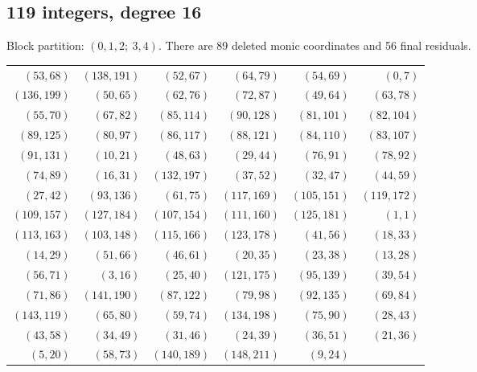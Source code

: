 \documentclass[10pt,letterpaper]{article}
\theoremstyle{remark}\newtheorem{remark}[theorem]{Remark}
\begin{document}
\subsection{119 integers, degree 16}
Block partition: $(0,1,2;\ 3,4)$.
There are 89 deleted monic coordinates and 56 final residuals.
\begin{center}\small\begin{tabular}{rrrrrr}\toprule
$(53,68)$ & $(138,191)$ & $(52,67)$ & $(64,79)$ & $(54,69)$ & $(0,7)$\\
$(136,199)$ & $(50,65)$ & $(62,76)$ & $(72,87)$ & $(49,64)$ & $(63,78)$\\
$(55,70)$ & $(67,82)$ & $(85,114)$ & $(90,128)$ & $(81,101)$ & $(82,104)$\\
$(89,125)$ & $(80,97)$ & $(86,117)$ & $(88,121)$ & $(84,110)$ & $(83,107)$\\
$(91,131)$ & $(10,21)$ & $(48,63)$ & $(29,44)$ & $(76,91)$ & $(78,92)$\\
$(74,89)$ & $(16,31)$ & $(132,197)$ & $(37,52)$ & $(32,47)$ & $(44,59)$\\
$(27,42)$ & $(93,136)$ & $(61,75)$ & $(117,169)$ & $(105,151)$ & $(119,172)$\\
$(109,157)$ & $(127,184)$ & $(107,154)$ & $(111,160)$ & $(125,181)$ & $(1,1)$\\
$(113,163)$ & $(103,148)$ & $(115,166)$ & $(123,178)$ & $(41,56)$ & $(18,33)$\\
$(14,29)$ & $(51,66)$ & $(46,61)$ & $(20,35)$ & $(23,38)$ & $(13,28)$\\
$(56,71)$ & $(3,16)$ & $(25,40)$ & $(121,175)$ & $(95,139)$ & $(39,54)$\\
$(71,86)$ & $(141,190)$ & $(87,122)$ & $(79,98)$ & $(92,135)$ & $(69,84)$\\
$(143,119)$ & $(65,80)$ & $(59,74)$ & $(134,198)$ & $(75,90)$ & $(28,43)$\\
$(43,58)$ & $(34,49)$ & $(31,46)$ & $(24,39)$ & $(36,51)$ & $(21,36)$\\
$(5,20)$ & $(58,73)$ & $(140,189)$ & $(148,211)$ & $(9,24)$ & \\
\bottomrule\end{tabular}\end{center}
\end{document}
